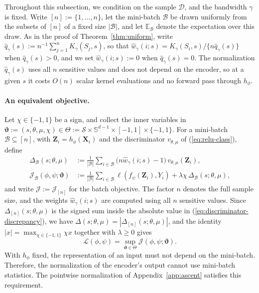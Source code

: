 \documentclass{article} %
\begin{document}
Throughout this subsection, we condition on the sample $\mathcal{D}$, and the bandwidth $\gamma$ is fixed.  Write $[n]:=\{1,\ldots,n\}$, let the mini-batch $\mathcal{B}$ be drawn uniformly from the subsets of $[n]$ of a fixed size $|\mathcal{B}|$, and let $\mathbb{E}_{\mathcal{B}}$ denote the expectation over this draw.  As in the proof of Theorem~\ref{thm:uniform}, write $\widehat{q}_{\gamma}(s):=n^{-1}\sum_{j=1}^{n}K_{\gamma}(S_j,s)$, so that $\widehat{w}_{\gamma}(i;s)=K_{\gamma}(S_i,s)/\{n\widehat{q}_{\gamma}(s)\}$ when $\widehat{q}_{\gamma}(s)>0$, and we set $\widehat{w}_{\gamma}(i;s):=0$ when $\widehat{q}_{\gamma}(s)=0$.  The normalization $\widehat{q}_{\gamma}(s)$ uses all $n$ sensitive values and does not depend on the encoder, so at a given $s$ it costs $O(n)$ scalar kernel evaluations and no forward pass through $h_{\phi}$.

\paragraph{An equivalent objective.}  Let $\chi\in\{-1,1\}$ be a sign, and collect the inner variables in $\boldsymbol{\vartheta}:=(s,\theta,\mu,\chi)\in\Theta:=\mathcal{S}\times\mathbb{S}^{d-1}\times[-1,1]\times\{-1,1\}$.  For a mini-batch $\mathcal{B}\subseteq[n]$, with $\mathbf{Z}_i=h_{\phi}(\mathbf{X}_i)$ and the discriminator $v_{\theta,\mu}$ of (\ref{eq:relu-class}), define
\begin{equation}
\begin{aligned}
  \Delta_{\mathcal{B}}(s;\theta,\mu)
  &:=\frac{1}{|\mathcal{B}|}\sum_{i\in\mathcal{B}}
     \bigl(n\widehat{w}_{\gamma}(i;s)-1\bigr)\,v_{\theta,\mu}(\mathbf{Z}_i),
  \\
  \mathcal{J}_{\mathcal{B}}(\phi,\psi;\boldsymbol{\vartheta})
  &:=\frac{1}{|\mathcal{B}|}\sum_{i\in\mathcal{B}}
     \ell\!\left(f_{\psi}(\mathbf{Z}_i),Y_i\right)
     +\lambda\chi\,\Delta_{\mathcal{B}}(s;\theta,\mu),
\end{aligned}
  \label{eq:mb-objective}
\end{equation}
and write $\mathcal{J}:=\mathcal{J}_{[n]}$ for the batch objective.  
The factor $n$ denotes the full sample size, and the weights $\widehat{w}_{\gamma}(i;s)$ are computed using all $n$ sensitive values.
Since $\Delta_{[n]}(s;\theta,\mu)$ is the signed sum inside the absolute value in (\ref{eq:discriminator-discrepancy}), we have $\Delta(s;\theta,\mu)=|\Delta_{[n]}(s;\theta,\mu)|$, and the identity $|x|=\max_{\chi\in\{-1,1\}}\chi x$ together with $\lambda\ge0$ gives
\begin{equation}
  \mathcal{L}(\phi,\psi)
  =\sup_{\boldsymbol{\vartheta}\in\Theta}\mathcal{J}(\phi,\psi;\boldsymbol{\vartheta}).
  \label{eq:mb-equivalent}
\end{equation}
With $h_{\phi}$ fixed, the representation of an input must not depend on the mini-batch.
Therefore, the normalization of the encoder's output cannot use mini-batch statistics.
The pointwise normalization of Appendix~\ref{app:ascent} satisfies this requirement.
\end{document}
